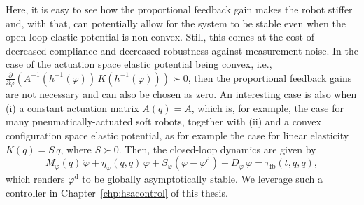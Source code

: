 Here, it is easy to see how the proportional feedback gain makes the robot stiffer and, with that, can potentially allow for the system to be stable even when the open-loop elastic potential is non-convex. Still, this comes at the cost of decreased compliance and decreased robustness against measurement noise.
In the case of the actuation space elastic potential being convex, i.e., $\frac{\partial}{\partial \varphi} \left (A^{-1}(h^{-1}(\varphi)) \,  K(h^{-1}(\varphi)) \right ) \succ 0$, then the proportional feedback gains are not necessary and can also be chosen as zero.
An interesting case is also when (i) a constant actuation matrix $A(q) = A$, which is, for example, the case for many pneumatically-actuated soft robots, together with (ii) and a convex configuration space elastic potential, as for example the case for linear elasticity $K(q) = S \, q$, where $S\succ 0$. Then, the closed-loop dynamics are given by
\begin{equation}
    M_\varphi(q) \, \ddot{\varphi} +  \eta_\varphi(q,\dot{q}) \, \dot{\varphi} + S_\varphi ( \varphi - \varphi^\mathrm{d} ) + D_\varphi \, \dot{\varphi} = \tau_\mathrm{fb}(t, q, \dot{q}),
\end{equation}
which renders $\varphi^\mathrm{d}$ to be globally asymptotically stable.
We leverage such a controller in Chapter~\ref{chp:hsacontrol} of this thesis.


